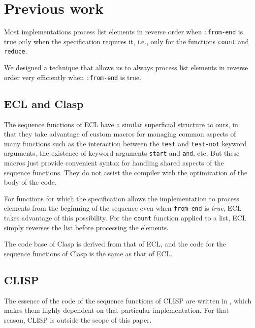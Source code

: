\section{Previous work}

Most implementations process list elements in reverse order when
\texttt{:from-end} is true only when the specification requires it,
i.e., only for the functions \texttt{count} and \texttt{reduce}.

We designed a technique \cite{Durand:2015:ELS:reverse} that allows us
to always process list elements in reverse order very efficiently when
\texttt{:from-end} is true.

\subsection{ECL and Clasp}

The sequence functions of ECL have a similar superficial structure to
ours, in that they take advantage of custom macros for managing common
aspects of many functions such as the interaction between the
\texttt{test} and \texttt{test-not} keyword arguments, the existence
of keyword arguments \texttt{start} and \texttt{and}, etc.
But these macros just provide convenient syntax for handling shared
aspects of the sequence functions.  They do not assist the compiler
with the optimization of the body of the code.

For functions for which the \commonlisp{} specification allows the
implementation to process elements from the beginning of the sequence
even when \texttt{from-end} is \emph{true}, ECL takes advantage of
this possibility.  For the \texttt{count} function applied to a list,
ECL simply reverses the list before processing the elements.

The \commonlisp{} code base of Clasp is derived from that of ECL, and
the code for the sequence functions of Clasp is the same as that of
ECL.

\subsection{CLISP}

The essence of the code of the sequence functions of CLISP are written
in \clanguage{}, which makes them highly dependent on that particular
implementation.  For that reason, CLISP is outside the scope of this
paper.
